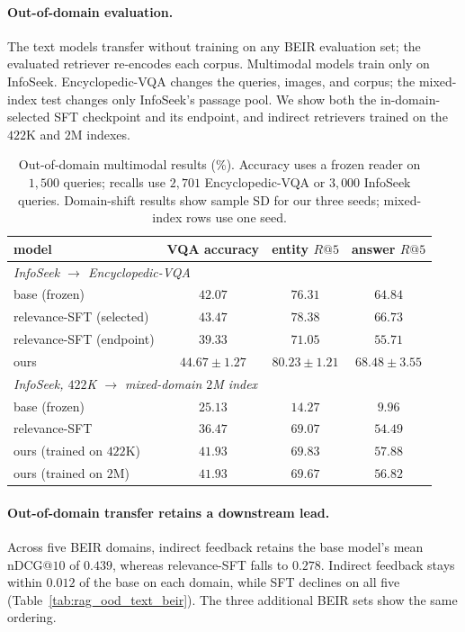 \paragraph{Out-of-domain evaluation.}
The text models transfer without training on any BEIR evaluation set; the evaluated retriever
re-encodes each corpus. Multimodal models train only on InfoSeek. Encyclopedic-VQA changes the
queries, images, and corpus; the mixed-index test changes only InfoSeek's passage pool. We show both
the in-domain-selected SFT checkpoint and its endpoint, and indirect retrievers trained on the
$422$K and $2$M indexes.



\begin{table}[H]
\centering\small
\caption{Out-of-domain multimodal results (\%). Accuracy uses a frozen reader on $1{,}500$
queries; recalls use $2{,}701$ Encyclopedic-VQA or $3{,}000$ InfoSeek queries. Domain-shift
results show sample SD for our three seeds; mixed-index rows use one seed.}
\label{tab:mm_ood_summary}
\begin{tabular}{lccc}
\toprule
model & VQA accuracy & entity $R@5$ & answer $R@5$ \\
\midrule
\multicolumn{4}{l}{\emph{InfoSeek $\rightarrow$ Encyclopedic-VQA}} \\
base (frozen) & $42.07$ & $76.31$ & $64.84$ \\
relevance-SFT (selected) & $43.47$ & $78.38$ & $66.73$ \\
relevance-SFT (endpoint) & $39.33$ & $71.05$ & $55.71$ \\
ours & $44.67\pm1.27$ & $80.23\pm1.21$ & $68.48\pm3.55$ \\
\midrule
\multicolumn{4}{l}{\emph{InfoSeek, $422$K $\rightarrow$ mixed-domain $2$M index}} \\
base (frozen) & $25.13$ & $14.27$ & $9.96$ \\
relevance-SFT & $36.47$ & $69.07$ & $54.49$ \\
ours (trained on $422$K) & $41.93$ & $69.83$ & $57.88$ \\
ours (trained on $2$M) & $41.93$ & $69.67$ & $56.82$ \\
\bottomrule
\end{tabular}
\end{table}

\paragraph{Out-of-domain transfer retains a downstream lead.}
Across five BEIR domains, indirect feedback retains the base model's mean nDCG@$10$ of $0.439$,
whereas relevance-SFT falls to $0.278$. Indirect feedback stays within $0.012$ of the base on each
domain, while SFT declines on all five (Table~\ref{tab:rag_ood_text_beir}). The three additional
BEIR sets show the same ordering.


